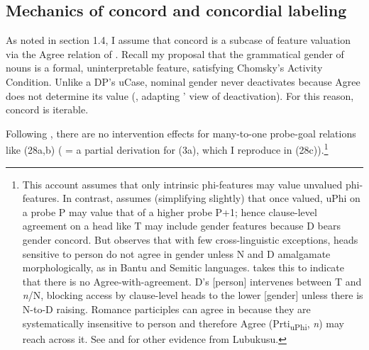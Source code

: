 \documentclass[output=paper
,modfonts
,nonflat]{langsci/langscibook}
\begin{document}
\subsection{Mechanics of concord and concordial labeling}
As noted in section 1.4, I assume that concord is a subcase of feature valuation via the Agree relation of \citealt{Chomsky2000, Chomsky2001}. Recall my proposal that the grammatical gender of nouns is a formal, uninterpretable feature, satisfying Chomsky's Activity Condition. Unlike a DP's uCase, nominal gender never deactivates because Agree does not determine its value (\citealt{Carstens2010, Carstens2011}, adapting \citealt{Nevins2005}' view of deactivation). For this reason, concord is iterable. 

Following \citet{Hiraiwa2001}, there are no intervention effects for many-to-one probe-goal relations like (28a,b) ( = a partial derivation for (3a), which I reproduce in (28c)).\footnote{This account assumes that only intrinsic phi-features may value unvalued phi-features. In contrast, \citet{Danon2011} assumes (simplifying slightly) that once valued, uPhi on a probe P may value that of a higher probe P+1; hence clause-level agreement on a head like T may include gender features because D bears gender concord. But \citet{Carstens2011} observes that with few cross-linguistic exceptions, heads sensitive to person do not agree in gender unless N and D amalgamate morphologically, as in Bantu and Semitic languages. \citet{Carstens2011} takes this to indicate that there is no Agree-with-agreement. D’s [person] intervenes between T and \textit{n}/N, blocking access by clause-level heads to the lower [gender] unless there is N-to-D raising. Romance participles can agree in because they are systematically insensitive to person and therefore Agree (Prti\textsubscript{uPhi}, \textit{n}) may reach across it. See \citealt{Carstens_Diercks2013b} and \citealt{Wasike2007} for other evidence from Lubukusu.} 
\end{document}
